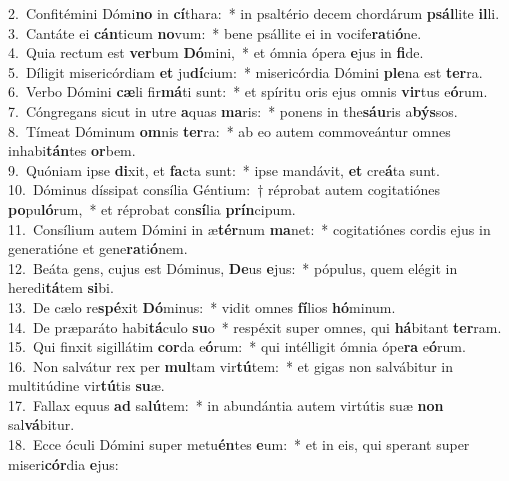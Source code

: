 {2.~}Confitémini Dómi\textbf{no} in \textbf{cí}thara:~* in psaltério decem chordárum \textbf{psál}lite \textbf{il}li.\\
{3.~}Cantáte ei \textbf{cán}ticum \textbf{no}vum:~* bene psállite ei in vocife\textbf{ra}ti\textbf{ó}ne.\\
{4.~}Quia rectum est \textbf{ver}bum \textbf{Dó}mini,~* et ómnia ópera \textbf{e}jus in \textbf{fi}de.\\
{5.~}Díligit misericórdiam \textbf{et} ju\textbf{dí}cium:~* misericórdia Dómini \textbf{ple}na est \textbf{ter}ra.\\
{6.~}Verbo Dómini \textbf{cæ}li fir\textbf{má}ti sunt:~* et spíritu oris ejus omnis \textbf{vir}tus e\textbf{ó}rum.\\
{7.~}Cóngregans sicut in utre \textbf{a}quas \textbf{ma}ris:~* ponens in the\textbf{sáu}ris a\textbf{býs}sos.\\
{8.~}Tímeat Dóminum \textbf{om}nis \textbf{ter}ra:~* ab eo autem commoveántur omnes inhabi\textbf{tán}tes \textbf{or}bem.\\
{9.~}Quóniam ipse \textbf{di}xit, et \textbf{fa}cta sunt:~* ipse mandávit, \textbf{et} cre\textbf{á}ta sunt.\\
{10.~}Dóminus díssipat consília Géntium:~† réprobat autem cogitatiónes \textbf{po}pu\textbf{ló}rum,~* et réprobat con\textbf{sí}lia \textbf{prín}cipum.\\
{11.~}Consílium autem Dómini in æ\textbf{tér}num \textbf{ma}net:~* cogitatiónes cordis ejus in generatióne et gene\textbf{ra}ti\textbf{ó}nem.\\
{12.~}Beáta gens, cujus est Dóminus, \textbf{De}us \textbf{e}jus:~* pópulus, quem elégit in heredi\textbf{tá}tem \textbf{si}bi.\\
{13.~}De cælo re\textbf{spé}xit \textbf{Dó}minus:~* vidit omnes \textbf{fí}lios \textbf{hó}minum.\\
{14.~}De præparáto habi\textbf{tá}culo \textbf{su}o~* respéxit super omnes, qui \textbf{há}bitant \textbf{ter}ram.\\
{15.~}Qui finxit sigillátim \textbf{cor}da e\textbf{ó}rum:~* qui intélligit ómnia ópe\textbf{ra} e\textbf{ó}rum.\\
{16.~}Non salvátur rex per \textbf{mul}tam vir\textbf{tú}tem:~* et gigas non salvábitur in multitúdine vir\textbf{tú}tis \textbf{su}æ.\\
{17.~}Fallax equus \textbf{ad} sa\textbf{lú}tem:~* in abundántia autem virtútis suæ \textbf{non} sal\textbf{vá}bitur.\\
{18.~}Ecce óculi Dómini super metu\textbf{én}tes \textbf{e}um:~* et in eis, qui sperant super miseri\textbf{cór}dia \textbf{e}jus:\\
